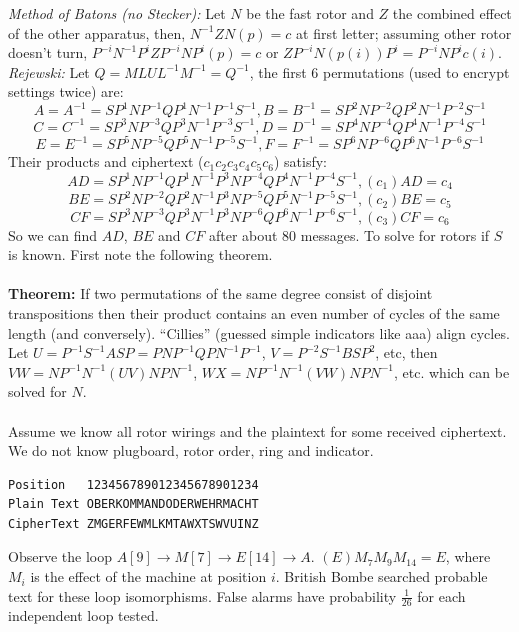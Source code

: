 \emph{Method of Batons (no Stecker):} 
Let $N$ be the fast rotor and $Z$ the combined 
effect of the other apparatus, then,
$N^{-1}ZN(p)=c$ 
at first letter; assuming other rotor doesn't turn,
$P^{-i}N^{-1}P^iZP^{-i}NP^i(p)=c$ or
$ZP^{-i}N(p(i))P^i= P^{-i}NP^i c(i)$.  \emph{Rejewski:}
Let $Q= MLUL^{-1}M^{-1}=Q^{-1}$,
the first 6 permutations (used to encrypt settings twice) are:
$$A=A^{-1}= SP^1NP^{-1}QP^1N^{-1}P^{-1}S^{-1}, B=B^{-1}= SP^2NP^{-2}QP^2N^{-1}P^{-2}S^{-1}$$
$$C=C^{-1}= SP^3NP^{-3}QP^3N^{-1}P^{-3}S^{-1}, D=D^{-1}= SP^4NP^{-4}QP^4N^{-1}P^{-4}S^{-1}$$
$$E=E^{-1}= SP^5NP^{-5}QP^5N^{-1}P^{-5}S^{-1}, F=F^{-1}= SP^6NP^{-6}QP^6N^{-1}P^{-6}S^{-1}$$
Their products and ciphertext ($c_1c_2c_3c_4c_5c_6$) satisfy:
$$AD= SP^1NP^{-1}QP^1N^{-1}P^3NP^{-4} QP^4N^{-1}P^{-4} S^{-1}, (c_1)AD= c_4$$
$$BE= SP^2NP^{-2}QP^2N^{-1}P^3NP^{-5}QP^5N^{-1}P^{-5}S^{-1}, (c_2)BE= c_5$$
$$CF= SP^3NP^{-3}QP^3N^{-1}P^3NP^{-6}QP^6N^{-1}P^{-6}S^{-1}, (c_3)CF= c_6$$
So we can find $AD$, $BE$ and $CF$ after about 80 messages.  To solve for rotors if
$S$ is known.  First note the following theorem.
\\
\\
{\bf Theorem: } If two permutations of the same 
degree consist of disjoint transpositions then their product contains an even number of cycles
of the same length (and conversely). ``Cillies'' (guessed simple indicators like aaa)
align cycles. Let $U=P^{-1}S^{-1}ASP= PNP^{-1}QPN^{-1}P^{-1}$,
$V= P^{-2}S^{-1}BSP^2$, etc, then 
$VW= NP^{-1}N^{-1} (UV)  N P N^{-1}$,
$WX= NP^{-1}N^{-1} (VW)  N P N^{-1}$, etc.
which can be solved for $N$.
\\
\\
Assume we know all rotor wirings and the plaintext for some received ciphertext. 
We do not know plugboard, rotor order, ring and indicator.
\begin{verbatim}
Position   123456789012345678901234
Plain Text OBERKOMMANDODERWEHRMACHT
CipherText ZMGERFEWMLKMTAWXTSWVUINZ
\end{verbatim}
Observe the loop $A[9] \rightarrow M[7] \rightarrow E[14] \rightarrow  A$.
$(E)M_7M_9M_{14}=E$, where $M_i$ is the effect of the machine at position $i$.
British Bombe searched probable text for these loop isomorphisms.  False alarms have probability
${\frac 1 {26}}$ for each independent loop tested.

